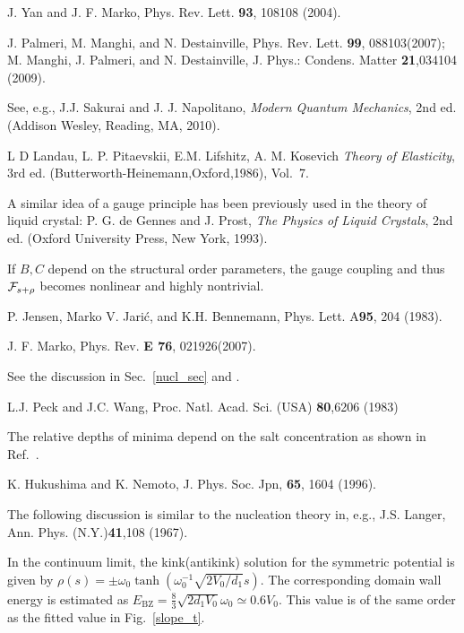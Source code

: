 \documentclass[pre,showpacs,twocolumn,superscriptaddress]{revtex4}
\begin{document}
\begin{thebibliography}{99}
J. Yan and J. F. Marko,
Phys. Rev. Lett. {\bf 93}, 108108 (2004).

J. Palmeri, M. Manghi, and N. Destainville,
Phys. Rev. Lett. {\bf 99}, 088103(2007);
M. Manghi, J. Palmeri, and N. Destainville, 
J. Phys.: Condens. Matter {\bf 21},034104 (2009).


See, e.g.,
J.J. Sakurai and J. J. Napolitano,
{\it Modern Quantum Mechanics}, 2nd ed.
 (Addison Wesley, Reading, MA, 2010).

L D Landau, L. P. Pitaevskii, E.M. Lifshitz, A. M. Kosevich
{\it Theory of Elasticity}, 3rd ed.
(Butterworth-Heinemann,Oxford,1986), Vol.~7.


A similar idea of a gauge principle has been previously used in
the theory of liquid crystal:
P. G. de Gennes and J. Prost,
{\it The Physics of Liquid Crystals}, 2nd ed.
(Oxford University Press, New York, 1993).

If $B, C$ depend on the structural order parameters, the gauge coupling
and thus ${\cal F}_{s+\rho}$ becomes nonlinear and highly nontrivial.


P. Jensen, Marko V. Jari\'c, and K.H. Bennemann,
Phys. Lett. A{\bf 95}, 204 (1983).

J. F. Marko,
Phys. Rev. {\bf E 76}, 021926(2007).

See the discussion in Sec.~\ref{nucl_sec}
and \cite{kinknote}.

L.J. Peck and J.C. Wang,
Proc. Natl. Acad. Sci. (USA) {\bf 80},6206 (1983) 


The relative depths of minima depend on the 
salt concentration as shown in Ref.~\cite{phi4,BZtrans}.

K. Hukushima and K. Nemoto,
J. Phys. Soc. Jpn,
{\bf 65},
1604 (1996).

The following discussion is similar to
the nucleation theory in, e.g.,
J.S. Langer, Ann. Phys. (N.Y.){\bf 41},108 (1967).


In the continuum limit,
the kink(antikink) solution for the symmetric potential is given by
$\rho(s) =\pm \omega_0 \tanh(\omega_0^{-1}\sqrt{2V_0/d_1}s)$.
The corresponding domain wall energy  is estimated as
$E_\text{BZ}=\frac{8}{3}\sqrt{2 d_1 V_0}\omega_0 \simeq 0.6 V_0$. 
This value is of the same order as the fitted value in Fig.~\ref{slope_t}.


\end{thebibliography}
\end{document}
